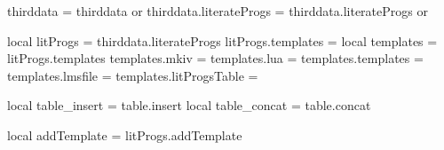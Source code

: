 thirddata               = thirddata               or {}
thirddata.literateProgs = thirddata.literateProgs or {}

local litProgs          = thirddata.literateProgs
litProgs.templates      = {}
local templates         = litProgs.templates
templates.mkiv          = {}
templates.lua           = {}
templates.templates     = {}
templates.lmsfile       = {}
templates.litProgsTable = {}

local table_insert = table.insert
local table_concat = table.concat

local addTemplate = litProgs.addTemplate
\stopLuaTemplate


\stopchapter
